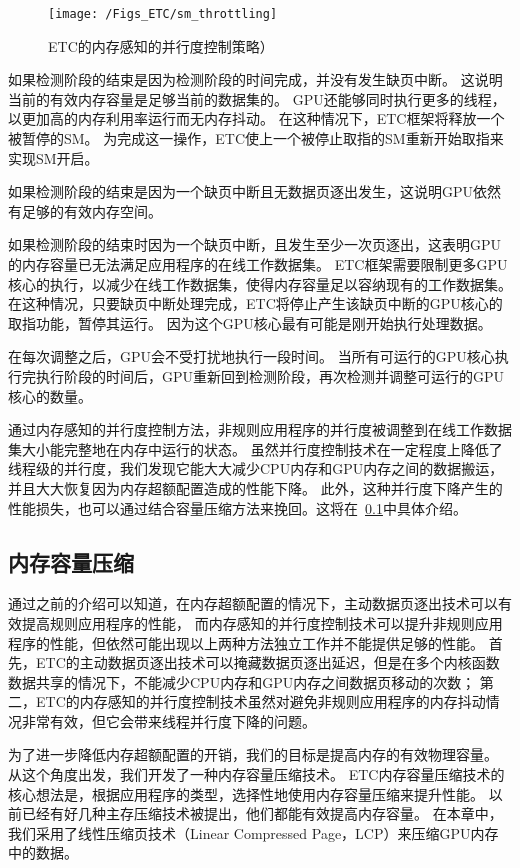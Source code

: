 \begin{figure}[htbp] %
  \centering
  \texttt{[image: /Figs\_ETC/sm\_throttling]}
  \caption{ETC的内存感知的并行度控制策略）}
  \label{fig:sm_throttling}
\end{figure}

如果检测阶段的结束是因为检测阶段的时间完成，并没有发生缺页中断。
这说明当前的有效内存容量是足够当前的数据集的。
GPU还能够同时执行更多的线程，以更加高的内存利用率运行而无内存抖动。
在这种情况下，ETC框架将释放一个被暂停的SM。
为完成这一操作，ETC使上一个被停止取指的SM重新开始取指来实现SM开启。

如果检测阶段的结束是因为一个缺页中断且无数据页逐出发生，这说明GPU依然有足够的有效内存空间。

如果检测阶段的结束时因为一个缺页中断，且发生至少一次页逐出，这表明GPU的内存容量已无法满足应用程序的在线工作数据集。
ETC框架需要限制更多GPU核心的执行，以减少在线工作数据集，使得内存容量足以容纳现有的工作数据集。
在这种情况，只要缺页中断处理完成，ETC将停止产生该缺页中断的GPU核心的取指功能，暂停其运行。
因为这个GPU核心最有可能是刚开始执行处理数据。

在每次调整之后，GPU会不受打扰地执行一段时间。
当所有可运行的GPU核心执行完执行阶段的时间后，GPU重新回到检测阶段，再次检测并调整可运行的GPU核心的数量。

通过内存感知的并行度控制方法，非规则应用程序的并行度被调整到在线工作数据集大小能完整地在内存中运行的状态。
虽然并行度控制技术在一定程度上降低了线程级的并行度，我们发现它能大大减少CPU内存和GPU内存之间的数据搬运，并且大大恢复因为内存超额配置造成的性能下降。
此外，这种并行度下降产生的性能损失，也可以通过结合容量压缩方法来挽回。这将在~\ref{compress}中具体介绍。

\subsection{内存容量压缩}
\label{compress}
通过之前的介绍可以知道，在内存超额配置的情况下，主动数据页逐出技术可以有效提高规则应用程序的性能，
而内存感知的并行度控制技术可以提升非规则应用程序的性能，但依然可能出现以上两种方法独立工作并不能提供足够的性能。
首先，ETC的主动数据页逐出技术可以掩藏数据页逐出延迟，但是在多个内核函数数据共享的情况下，不能减少CPU内存和GPU内存之间数据页移动的次数；
第二，ETC的内存感知的并行度控制技术虽然对避免非规则应用程序的内存抖动情况非常有效，但它会带来线程并行度下降的问题。

为了进一步降低内存超额配置的开销，我们的目标是提高内存的有效物理容量。
从这个角度出发，我们开发了一种内存容量压缩技术。
ETC内存容量压缩技术的核心想法是，根据应用程序的类型，选择性地使用内存容量压缩来提升性能。
以前已经有好几种主存压缩技术被提出，他们都能有效提高内存容量。
在本章中，我们采用了线性压缩页技术（Linear Compressed Page，LCP）来压缩GPU内存中的数据。

